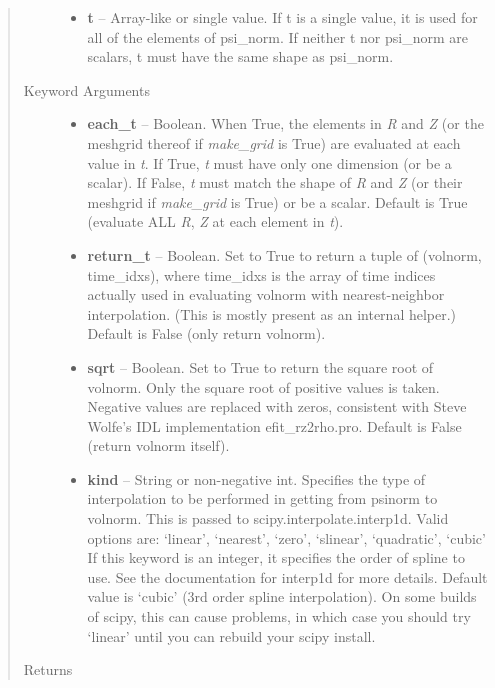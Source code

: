 \documentclass[letterpaper,10pt,english]{sphinxmanual}
\begin{document}
\begin{fulllineitems}
\begin{fulllineitems}
\begin{quote}
\begin{description}
\begin{itemize}
\item {} 
\textbf{t} --
Array-like or single value.
If t is a single value, it is used
for all of the elements of psi\_norm. If neither t nor psi\_norm
are scalars, t must have the same shape as psi\_norm.

\end{itemize}

\item[{Keyword Arguments}] \leavevmode\begin{itemize}
\item {} 
\textbf{each\_t} --
Boolean.
When True, the elements in \emph{R} and \emph{Z} (or the meshgrid thereof
if \emph{make\_grid} is True) are evaluated at each value in \emph{t}. If
True, \emph{t} must have only one dimension (or be a scalar). If
False, \emph{t} must match the shape of \emph{R} and \emph{Z} (or their
meshgrid if \emph{make\_grid} is True) or be a scalar. Default is True
(evaluate ALL \emph{R}, \emph{Z} at each element in \emph{t}).

\item {} 
\textbf{return\_t} --
Boolean.
Set to True to return a tuple of (volnorm,
time\_idxs), where time\_idxs is the array of time indices
actually used in evaluating volnorm with nearest-neighbor
interpolation. (This is mostly present as an internal helper.)
Default is False (only return volnorm).

\item {} 
\textbf{sqrt} --
Boolean. Set to True to return the square root of volnorm.
Only the square root of positive values is taken. Negative
values are replaced with zeros, consistent with Steve Wolfe's
IDL implementation efit\_rz2rho.pro. Default is False (return
volnorm itself).

\item {} 
\textbf{kind} --
String or non-negative int.
Specifies the type of interpolation
to be performed in getting from psinorm to volnorm. This is
passed to scipy.interpolate.interp1d. Valid options are:
`linear', `nearest', `zero', `slinear', `quadratic', `cubic'
If this keyword is an integer, it specifies the order of spline
to use. See the documentation for interp1d for more details.
Default value is `cubic' (3rd order spline interpolation). On
some builds of scipy, this can cause problems, in which case
you should try `linear' until you can rebuild your scipy install.

\end{itemize}

\item[{Returns}] \leavevmode


\end{description}
\end{quote}
\end{fulllineitems}
\end{fulllineitems}
\end{document}
